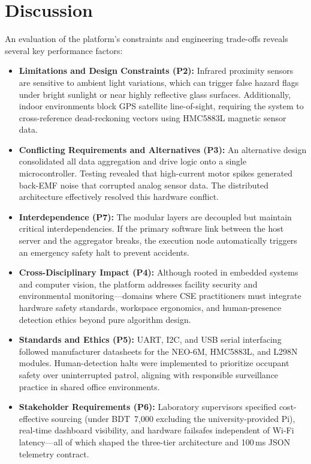 \documentclass[conference]{IEEEtran}
\begin{document}
\section{Discussion}
An evaluation of the platform's constraints and engineering trade-offs reveals several key performance factors:

\begin{itemize}
    \item \textbf{Limitations and Design Constraints (P2):} Infrared proximity sensors are sensitive to ambient light variations, which can trigger false hazard flags under bright sunlight or near highly reflective glass surfaces. Additionally, indoor environments block GPS satellite line-of-sight, requiring the system to cross-reference dead-reckoning vectors using HMC5883L magnetic sensor data.

    \item \textbf{Conflicting Requirements and Alternatives (P3):} An alternative design consolidated all data aggregation and drive logic onto a single microcontroller. Testing revealed that high-current motor spikes generated back-EMF noise that corrupted analog sensor data. The distributed architecture effectively resolved this hardware conflict.

    \item \textbf{Interdependence (P7):} The modular layers are decoupled but maintain critical interdependencies. If the primary software link between the host server and the aggregator breaks, the execution node automatically triggers an emergency safety halt to prevent accidents.

    \item \textbf{Cross-Disciplinary Impact (P4):} Although rooted in embedded systems and computer vision, the platform addresses facility security and environmental monitoring---domains where CSE practitioners must integrate hardware safety standards, workspace ergonomics, and human-presence detection ethics beyond pure algorithm design.

    \item \textbf{Standards and Ethics (P5):} UART, I2C, and USB serial interfacing followed manufacturer datasheets for the NEO-6M, HMC5883L, and L298N modules. Human-detection halts were implemented to prioritize occupant safety over uninterrupted patrol, aligning with responsible surveillance practice in shared office environments.

    \item \textbf{Stakeholder Requirements (P6):} Laboratory supervisors specified cost-effective sourcing (under BDT~7{,}000 excluding the university-provided Pi), real-time dashboard visibility, and hardware failsafes independent of Wi-Fi latency---all of which shaped the three-tier architecture and 100\,ms JSON telemetry contract.
\end{itemize}
\end{document}
